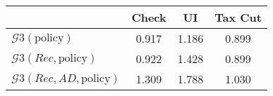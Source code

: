 \begin{tabular}{@{}lccc@{}} 
\toprule 
                          & Check      & UI    & Tax Cut    \\  \midrule 
$\mathcal{G}3(\text{policy})$ & 0.917  & 1.186  & 0.899     \\ 
$\mathcal{G}3(Rec,\text{policy})$ & 0.922  & 1.428  & 0.899     \\ 
$\mathcal{G}3(Rec, AD,\text{policy})$ & 1.309  & 1.788  & 1.030     \\ 
\end{tabular}  
